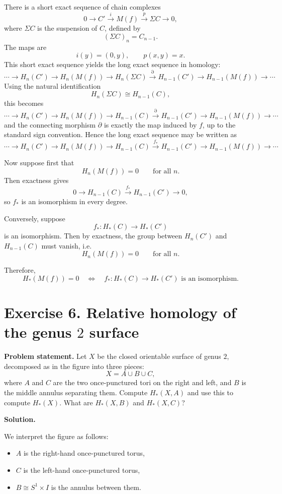 \documentclass[12pt,a4paper]{article}
\theoremstyle{notespace}
\begin{document}
There is a short exact sequence of chain complexes
\[
0\longrightarrow C' \xrightarrow{i} M(f)\xrightarrow{p} \Sigma C \longrightarrow 0,
\]
where \(\Sigma C\) is the suspension of \(C\), defined by
\[
(\Sigma C)_n=C_{n-1}.
\]
The maps are
\[
i(y)=(0,y),\qquad p(x,y)=x.
\]
This short exact sequence yields the long exact sequence in homology:
\[
\cdots
\to H_n(C')
\to H_n(M(f))
\to H_n(\Sigma C)
\xrightarrow{\partial}
H_{n-1}(C')
\to H_{n-1}(M(f))
\to \cdots
\]
Using the natural identification
\[
H_n(\Sigma C)\cong H_{n-1}(C),
\]
this becomes
\[
\cdots
\to H_n(C')
\to H_n(M(f))
\to H_{n-1}(C)
\xrightarrow{\partial}
H_{n-1}(C')
\to H_{n-1}(M(f))
\to \cdots
\]
and the connecting morphism \(\partial\) is exactly the map induced by \(f\), up to the standard sign convention. Hence the long exact sequence may be written as
\[
\cdots
\to H_n(C')
\to H_n(M(f))
\to H_{n-1}(C)
\xrightarrow{f_*}
H_{n-1}(C')
\to H_{n-1}(M(f))
\to \cdots
\]

Now suppose first that
\[
H_n(M(f))=0
\qquad\text{for all }n.
\]
Then exactness gives
\[
0\to H_{n-1}(C)\xrightarrow{f_*} H_{n-1}(C')\to 0,
\]
so \(f_*\) is an isomorphism in every degree.

Conversely, suppose
\[
f_*:H_*(C)\to H_*(C')
\]
is an isomorphism. Then by exactness, the group between \(H_n(C')\) and \(H_{n-1}(C)\) must vanish, i.e.
\[
H_n(M(f))=0
\qquad\text{for all }n.
\]

Therefore,
\[
H_*(M(f))=0
\quad\Longleftrightarrow\quad
f_*:H_*(C)\to H_*(C')
\text{ is an isomorphism.}
\]

\bigskip

\section{Exercise 6. Relative homology of the genus \(2\) surface}

\textbf{Problem statement.}
Let \(X\) be the closed orientable surface of genus \(2\), decomposed as in the figure into three pieces:
\[
X=A\cup B\cup C,
\]
where \(A\) and \(C\) are the two once-punctured tori on the right and left, and \(B\) is the middle annulus separating them. Compute \(H_*(X,A)\) and use this to compute \(H_*(X)\). What are \(H_*(X,B)\) and \(H_*(X,C)\)?

\medskip
\textbf{Solution.}

We interpret the figure as follows:

\begin{itemize}
	\item \(A\) is the right-hand once-punctured torus,
	\item \(C\) is the left-hand once-punctured torus,
	\item \(B\cong S^1\times I\) is the annulus between them.
\end{itemize}
\end{document}
